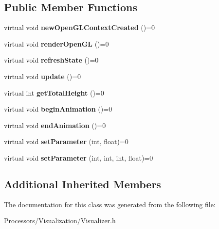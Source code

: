 \subsection*{Public Member Functions}
\begin{DoxyCompactItemize}
\item 
\hypertarget{classVisualizer_ad68a445fc8dcd77c1f49c354ba888807}{virtual void {\bfseries new\-Open\-G\-L\-Context\-Created} ()=0}\label{classVisualizer_ad68a445fc8dcd77c1f49c354ba888807}

\item 
\hypertarget{classVisualizer_a50903eb0365edf476d1323d41719f8ff}{virtual void {\bfseries render\-Open\-G\-L} ()=0}\label{classVisualizer_a50903eb0365edf476d1323d41719f8ff}

\item 
\hypertarget{classVisualizer_a2a5ff831cf144f1fd887395f055d9ed4}{virtual void {\bfseries refresh\-State} ()=0}\label{classVisualizer_a2a5ff831cf144f1fd887395f055d9ed4}

\item 
\hypertarget{classVisualizer_a0fe43ca2f65258eeb5612a52495d4ce5}{virtual void {\bfseries update} ()=0}\label{classVisualizer_a0fe43ca2f65258eeb5612a52495d4ce5}

\item 
\hypertarget{classVisualizer_ae77321ed5287628e8d6c11728f480138}{virtual int {\bfseries get\-Total\-Height} ()=0}\label{classVisualizer_ae77321ed5287628e8d6c11728f480138}

\item 
\hypertarget{classVisualizer_a0be9e571d391521a48f55a509487d0e7}{virtual void {\bfseries begin\-Animation} ()=0}\label{classVisualizer_a0be9e571d391521a48f55a509487d0e7}

\item 
\hypertarget{classVisualizer_a990653e6c62bd9e7fbc183fd14820a4f}{virtual void {\bfseries end\-Animation} ()=0}\label{classVisualizer_a990653e6c62bd9e7fbc183fd14820a4f}

\item 
\hypertarget{classVisualizer_a6ff2b57ce80c2baec048c467792cc301}{virtual void {\bfseries set\-Parameter} (int, float)=0}\label{classVisualizer_a6ff2b57ce80c2baec048c467792cc301}

\item 
\hypertarget{classVisualizer_a44b37adda5e799112ca835442a977d06}{virtual void {\bfseries set\-Parameter} (int, int, int, float)=0}\label{classVisualizer_a44b37adda5e799112ca835442a977d06}

\end{DoxyCompactItemize}
\subsection*{Additional Inherited Members}


The documentation for this class was generated from the following file\-:\begin{DoxyCompactItemize}
\item 
Processors/\-Visualization/Visualizer.\-h\end{DoxyCompactItemize}

